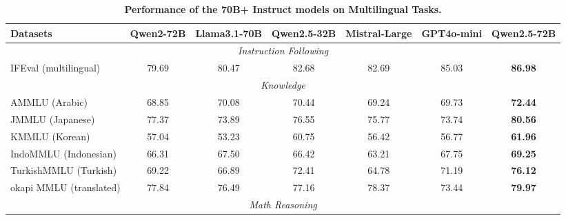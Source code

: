 \documentclass{article}
\begin{document}
\begin{table}[t]

\centering

\small

\caption{\textbf{Performance of the 70B+ Instruct models on Multilingual Tasks.}}

\label{tab:eval_multilingual_70B}

\setlength{\tabcolsep}{2.6pt}

\begin{tabular}{@{}lcccccc@{}}

\toprule

\textbf{Datasets} & \textbf{Qwen2-72B} & \textbf{Llama3.1-70B} & \textbf{Qwen2.5-32B} & \textbf{Mistral-Large} & \textbf{GPT4o-mini} & \textbf{Qwen2.5-72B} \\

\midrule

\multicolumn{7}{c}{\textit{Instruction Following}} \\

\midrule

IFEval (multilingual) & 79.69 & 80.47 & 82.68 & 82.69 & 85.03 & \textbf{86.98} \\

\midrule

\multicolumn{7}{c}{\textit{Knowledge}} \\

\midrule

AMMLU (Arabic) & 68.85 & 70.08 & 70.44 & 69.24 & 69.73 & \textbf{72.44} \\

JMMLU (Japanese) & 77.37 & 73.89 & 76.55 & 75.77 & 73.74 & \textbf{80.56} \\

KMMLU (Korean) & 57.04 & 53.23 & 60.75 & 56.42 & 56.77 & \textbf{61.96} \\

IndoMMLU (Indonesian) & 66.31 & 67.50 & 66.42 & 63.21 & 67.75 & \textbf{69.25} \\

TurkishMMLU (Turkish) & 69.22 & 66.89 & 72.41 & 64.78 & 71.19 & \textbf{76.12} \\

okapi MMLU (translated) & 77.84 & 76.49 & 77.16 & 78.37 & 73.44 & \textbf{79.97} \\

\midrule

\multicolumn{7}{c}{\textit{Math Reasoning}} \\


\end{tabular}
\end{table}
\end{document}
